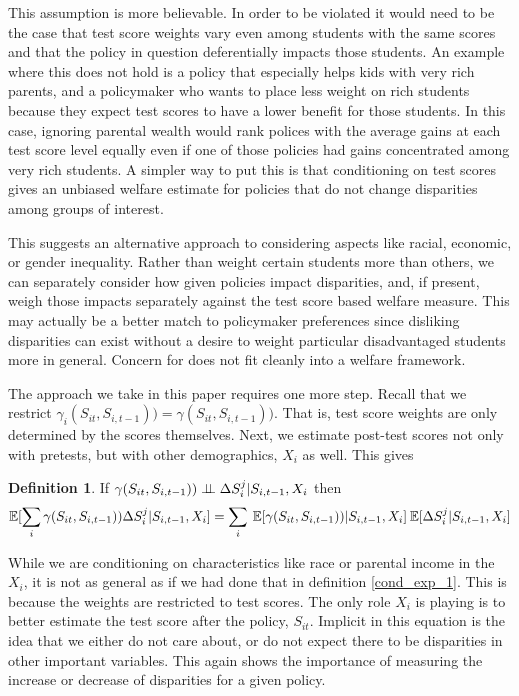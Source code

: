 \documentclass{article}
\theoremstyle{definition}
\theoremstyle{definition}
\theoremstyle{definition}
\theoremstyle{definition}
\newtheorem{definition}{Definition}
\begin{document}
    This assumption is more believable. In order to be violated it would need to be the case that test score weights vary even among students with the same scores and that the policy in question deferentially impacts those students. An example where this does not hold is a policy that especially helps kids with very rich parents, and a policymaker who wants to place less weight on rich students because they expect test scores to have a lower benefit for those students. In this case, ignoring parental wealth would rank polices with the average gains at each test score level equally even if one of those policies had gains concentrated among very rich students. A simpler way to put this is that conditioning on test scores gives an unbiased welfare estimate for policies that do not change disparities among groups of interest. 
    
    This suggests an alternative approach to considering aspects like racial, economic, or gender inequality. Rather than weight certain students more than others, we can separately consider how given policies impact disparities, and, if present, weigh those impacts separately against the test score based welfare measure. This may actually be a better match to policymaker preferences since disliking disparities can exist without a desire to weight particular disadvantaged students more in general. Concern for does not fit cleanly into a welfare framework. 
    
    The approach we take in this paper requires one more step. Recall that we restrict $\gamma_i(S_{it}, S_{i,t-1})) = \gamma(S_{it}, S_{i,t-1}))$. That is, test score weights are only determined by the scores themselves. Next, we estimate post-test scores not only with pretests, but with other demographics, $X_i$ as well. This gives 
    
    \begin{definition}
    \label{indep_def_used}
        If $ \gamma(S_{it}, S_{i,t-1})) \perp \!\!\! \perp \Delta S_i^j |S_{i,t-1}, X_i $ then
        \begin{equation*}
           \mathbb{E}[\sum_i \gamma(S_{it}, S_{i,t-1})) \Delta S_i^j| S_{i,t-1}, X_i]= \sum_i \: \mathbb{E}[\gamma(S_{it}, S_{i,t-1}))|S_{i,t-1}, X_i] \:\mathbb{E}[\Delta S_i^j|S_{i,t-1}, X_i] 
        \end{equation*}
    \end{definition}
    
    While we are conditioning on characteristics like race or parental income in the $X_i$, it is not as general as if we had done that in definition \ref{cond_exp_1}. This is because the weights are restricted to test scores. The only role $X_i$ is playing is to better estimate the test score after the policy, $S_{it}$. Implicit in this equation is the idea that we either do not care about, or do not expect there to be disparities in other important variables. This again shows the importance of measuring the increase or decrease of disparities for a given policy. 
    
\end{document}
